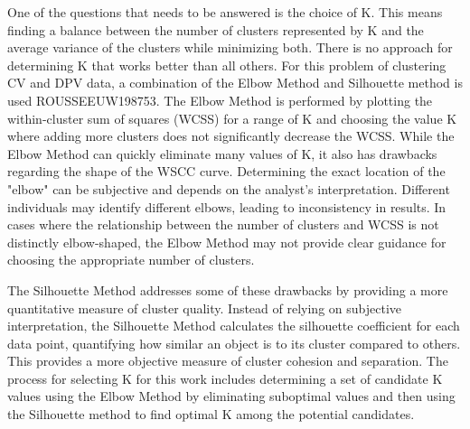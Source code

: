 One of the questions that needs to be answered is the choice of K. This means finding a balance between the number of clusters represented by K and the average variance of the clusters while minimizing both. There is no approach for determining K that works better than all others. For this problem of clustering CV and DPV data, a combination of the Elbow Method \cite{Thorndike1953} and Silhouette method is used {ROUSSEEUW198753}. The Elbow Method is performed by plotting the within-cluster sum of squares (WCSS) for a range of K and choosing the value K where adding more clusters does not significantly decrease the WCSS. While the Elbow Method can quickly eliminate many values of K, it also has drawbacks regarding the shape of the WSCC curve. Determining the exact location of the "elbow" can be subjective and depends on the analyst's interpretation. Different individuals may identify different elbows, leading to inconsistency in results. In cases where the relationship between the number of clusters and WCSS is not distinctly elbow-shaped, the Elbow Method may not provide clear guidance for choosing the appropriate number of clusters.

The Silhouette Method addresses some of these drawbacks by providing a more quantitative measure of cluster quality. Instead of relying on subjective interpretation, the Silhouette Method calculates the silhouette coefficient for each data point, quantifying how similar an object is to its cluster compared to others. This provides a more objective measure of cluster cohesion and separation. The process for selecting K for this work includes determining a set of candidate K values using the Elbow Method by eliminating suboptimal values and then using the Silhouette method to find optimal K among the potential candidates. 
